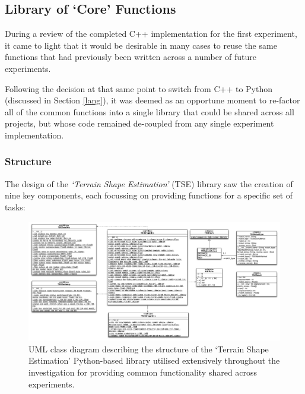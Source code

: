 \subsection{Library of `Core' Functions}

During a review of the completed C++ implementation for the first experiment, it came to light that it would be desirable in many cases to reuse the same functions that had previously been written across a number of future experiments. 

Following the decision at that same point to switch from C++ to Python (discussed in Section \ref{lang}), it was deemed as an opportune moment to re-factor all of the common functions into a single library that could be shared across all projects, but whose code remained de-coupled from any single experiment implementation. 

\subsubsection{Structure}

The design of the \textit{`Terrain Shape Estimation'} (TSE) library saw the creation of nine key components, each focussing on providing functions for a specific set of tasks:

\begin{figure}[ht!]
\centering
\includegraphics[scale=0.25]{images/tse_class_diagram}
  \caption{UML class diagram describing the structure of the `Terrain Shape Estimation'  Python-based library utilised extensively throughout the investigation for providing common functionality shared across experiments.}
\label{fig:rig}
\end{figure} 

